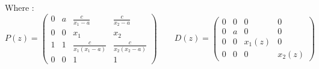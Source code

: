 \documentclass{article}
\begin{document}
\begin{flushleft}
Where :
\begin{equation}
P(z) = 
\begin{pmatrix} 
0 & a &  \frac{c}{x_{1}-a} &  \frac{c}{x_{2}-a} \\
0 & 0 & x_{1} & x_{2} \\
1 & 1 &  \frac{c}{x_{1}(x_{1}-a)} &  \frac{c}{x_{2}(x_{2}-a)}\\
0 & 0 &  1 & 1
\end{pmatrix}
\quad \quad
D(z) = 
\begin{pmatrix} 
0 & 0 & 0 &  0 \\
0 & a & 0 & 0\\
0 & 0 & x_{1}(z) &  0\\
0 & 0 &  0&  x_{2}(z)
\end{pmatrix}
\end{equation}

\end{flushleft}
\end{document}
